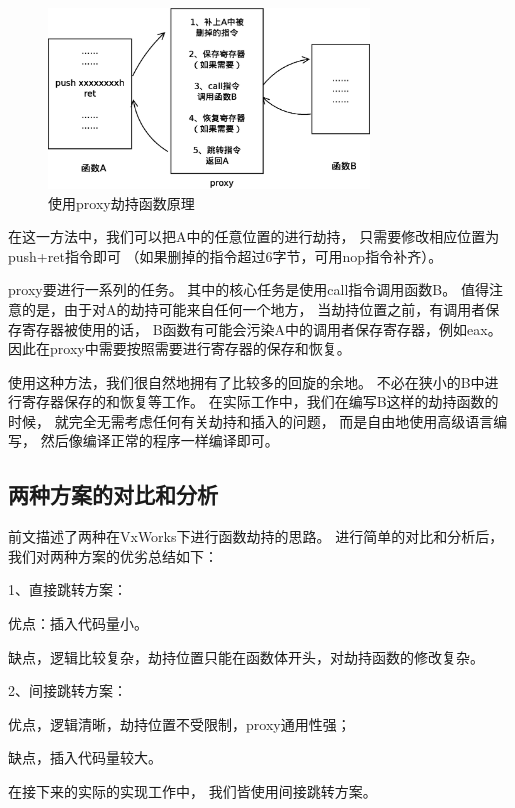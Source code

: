 \begin{figure}[h!]
    \centering
    \includegraphics[width=0.76\textwidth]{figure/ab2.eps}
    \caption{使用proxy劫持函数原理}
    \label{ab2}
\end{figure}

在这一方法中，我们可以把A中的任意位置的进行劫持，
只需要修改相应位置为push+ret指令即可
（如果删掉的指令超过6字节，可用nop指令补齐）。

proxy要进行一系列的任务。
其中的核心任务是使用call指令调用函数B。
值得注意的是，由于对A的劫持可能来自任何一个地方，
当劫持位置之前，有调用者保存寄存器被使用的话，
B函数有可能会污染A中的调用者保存寄存器，例如eax。
因此在proxy中需要按照需要进行寄存器的保存和恢复。


使用这种方法，我们很自然地拥有了比较多的回旋的余地。
不必在狭小的B中进行寄存器保存的和恢复等工作。
在实际工作中，我们在编写B这样的劫持函数的时候，
就完全无需考虑任何有关劫持和插入的问题，
而是自由地使用高级语言编写，
然后像编译正常的程序一样编译即可。

\subsection{两种方案的对比和分析}

前文描述了两种在VxWorks下进行函数劫持的思路。
进行简单的对比和分析后，我们对两种方案的优劣总结如下：

1、直接跳转方案：

优点：插入代码量小。

缺点，逻辑比较复杂，劫持位置只能在函数体开头，对劫持函数的修改复杂。

2、间接跳转方案：

优点，逻辑清晰，劫持位置不受限制，proxy通用性强；

缺点，插入代码量较大。

在接下来的实际的实现工作中，
我们皆使用间接跳转方案。







